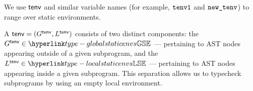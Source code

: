 \begin{definition}
\end{definition}

We use $\textsf{tenv}$ and similar variable names (for example, $\texttt{tenv1}$ and $\texttt{new\_tenv}$) to range over static environments.

A \staticenvironmentterm{} $\textsf{tenv}=(G^{\textsf{tenv}}, L^{\textsf{tenv}})$ consists of two
distinct components: the \emph{\globalstaticenvironmentterm} $G^\tenv \in \globalstaticenvs$ --- pertaining to AST nodes
appearing outside of a given subprogram, and the \emph{\localstaticenvironmentterm}
$L^\tenv \in \localstaticenvs$ --- pertaining to AST nodes appearing inside a given subprogram.
This separation allows us to typecheck subprograms by using an empty local environment.

